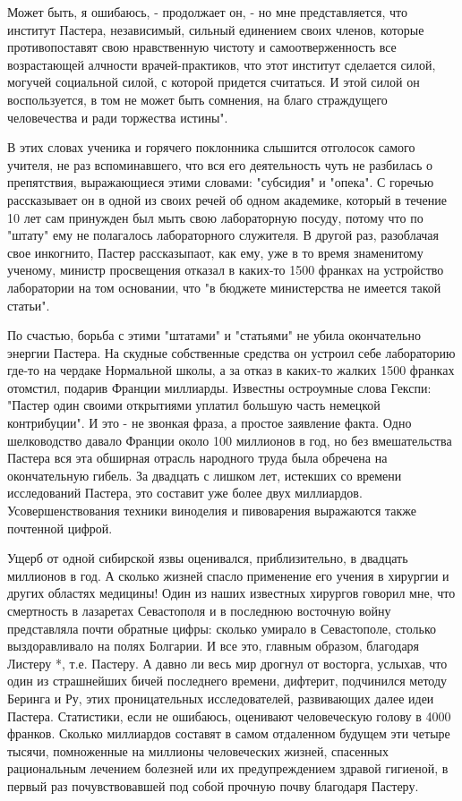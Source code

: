 Может быть, я ошибаюсь, - продолжает он, - но мне представляется, что
институт Пастера, независимый, сильный единением своих членов, которые
противопоставят свою нравственную чистоту и самоотверженность все
возрастающей алчности врачей-практиков, что этот институт сделается
силой, могучей социальной силой, с которой придется считаться. И этой
силой он воспользуется, в том не может быть сомнения, на благо
страждущего человечества и ради торжества истины".

В этих словах  ученика и горячего  поклонника слышится отголосок  самого
учителя,  не  раз  вспоминавшего,  что  вся  его  деятельность  чуть  не
разбилась  о  препятствия,  выражающиеся  этими  словами:  "субсидия"  и
"опека". С  горечью рассказывает  он в  одной из  своих речей  об  одном
академике, который  в  течение  10  лет  сам  принужден  был  мыть  свою
лабораторную  посуду,   потому  что   по  "штату"   ему  не   полагалось
лабораторного служителя. В другой раз, разоблачая свое инкогнито, Пастер
рассказыпаот, как  ему,  уже в  то  время знаменитому  ученому,  министр
просвещения отказал в каких-то 1500 франках на устройство лаборатории на
том основании, что "в бюджете министерства не имеется такой статьи".

По счастью, борьба с этими "штатами" и "статьями" не убила  окончательно
энергии  Пастера.  На  скудные  собственные  средства  он  устроил  себе
лабораторию где-то на чердаке  Нормальной школы, а  за отказ в  каких-то
жалких  1500  франках  отомстил,  подарив  Франции  миллиарды.  Известны
остроумные слова Гекспи: "Пастер один своими открытиями уплатил  большую
часть немецкой  контрибуции".  И  это  - не  звонкая  фраза,  а  простое
заявление факта. Одно шелководство давало Франции около 100 миллионов  в
год, но без  вмешательства Пастера  вся эта  обширная отрасль  народного
труда была обречена на окончательную  гибель. За двадцать с лишком  лет,
истекших со времени  исследований Пастера, это  составит уже более  двух
миллиардов.   Усовершенствования   техники   виноделия   и   пивоварения
выражаются также почтенной цифрой.

Ущерб от  одной сибирской  язвы оценивался,  приблизительно, в  двадцать
миллионов в  год.  А  сколько  жизней спасло  применение  его  учения  в
хирургии и других  областях медицины! Один  из наших известных  хирургов
говорил мне,  что  смертность  в лазаретах  Севастополя  и  в  последнюю
восточную войну  представляла почти  обратные цифры:  сколько умирало  в
Севастополе, столько  выздоравливало  на  полях  Болгарии.  И  все  это,
главным образом, благодаря Листеру *, т.е. Пастеру. А давно ли весь  мир
дрогнул от восторга, услыхав, что  один из страшнейших бичей  последнего
времени, дифтерит, подчинился методу  Беринга и Ру, этих  проницательных
исследователей, развивающих  далее  идеи Пастера.  Статистики,  если  не
ошибаюсь,  оценивают  человеческую  голову   в  4000  франков.   Сколько
миллиардов составят  в  самом  отдаленном  будущем  эти  четыре  тысячи,
помноженные на  миллионы  человеческих  жизней,  спасенных  рациональным
лечением болезней или их предупреждением здравой гигиеной, в первый  раз
почувствовавшей под собой прочную почву благодаря Пастеру.

